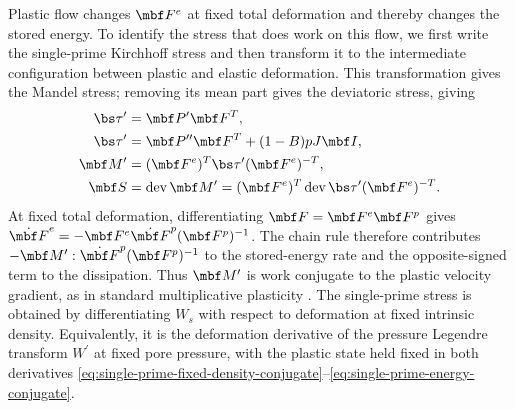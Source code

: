 Plastic flow changes \(\mbf F^e\) at fixed total deformation and thereby
changes the stored energy.  To identify the stress that does work on this
flow, we first write the single-prime Kirchhoff stress and then transform it
to the intermediate configuration between plastic and elastic deformation.
This transformation gives the Mandel stress; removing its mean part gives
the deviatoric stress, giving
\begin{align}
 \bs\tau^{\prime}
 &=\mbf P^{\prime}\mbf F^T,
 \notag
\\
 \bs\tau^{\prime}&=\mbf P^{\prime\prime}\mbf F^T+(1-B)pJ\mbf I,
 \label{eq:single-prime-kirchhoff-stress}\\
 \mbf M^{\prime}&=(\mbf F^e)^T
 \bs\tau^{\prime}(\mbf F^e)^{-T},
 \notag
\\
 \mbf S&=\operatorname{dev}\mbf M^{\prime}
 =(\mbf F^e)^T
 \operatorname{dev}\bs\tau^{\prime}(\mbf F^e)^{-T}.
 \notag
\end{align}
At fixed total deformation, differentiating
\(\mbf F=\mbf F^e\mbf F^p\) gives
\(\dot{\mbf F}^e=-\mbf F^e\dot{\mbf F}^p(\mbf F^p)^{-1}\).
The chain rule therefore contributes
\(-\mbf M^{\prime}:\dot{\mbf F}^p(\mbf F^p)^{-1}\) to the stored-energy
rate and the opposite-signed term to the dissipation.  Thus
\(\mbf M^{\prime}\) is work conjugate to the plastic velocity gradient, as in
standard multiplicative plasticity \citep{yamakawaetal2021}.  The single-prime
stress is obtained by differentiating \(W_s\) with respect to deformation at
fixed intrinsic density.  Equivalently, it is the deformation derivative of
the pressure Legendre transform \(W^{\prime}\) at fixed pore pressure, with
the plastic state held fixed in both derivatives
\eqref{eq:single-prime-fixed-density-conjugate}--\eqref{eq:single-prime-energy-conjugate}.

